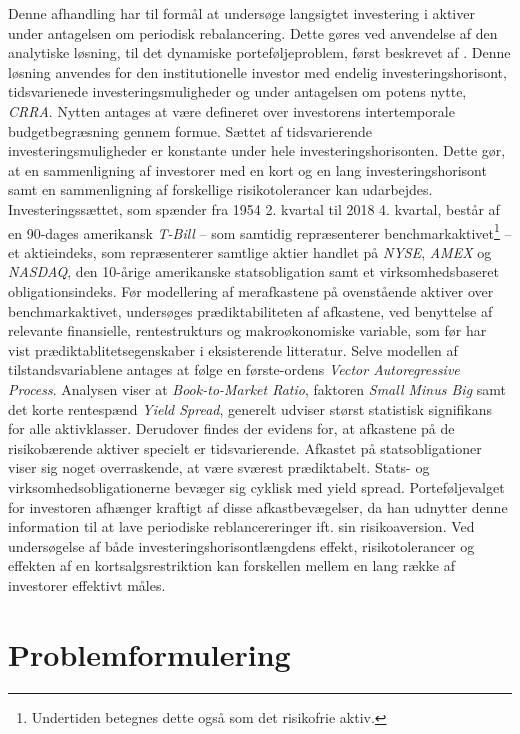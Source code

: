 \documentclass[
  a4paper,
  oneside]{memoir}
\begin{document}
Denne afhandling har til formål at undersøge langsigtet investering i aktiver under antagelsen om periodisk rebalancering. Dette gøres ved anvendelse af den analytiske løsning, til det dynamiske porteføljeproblem, først beskrevet af \citep{JurVic2011}. Denne løsning anvendes for den institutionelle investor med endelig investeringshorisont, tidsvarienede investeringsmuligheder og under antagelsen om potens nytte, \emph{CRRA}. Nytten antages at være defineret over investorens intertemporale budgetbegræsning gennem formue. Sættet af tidsvarierende investeringsmuligheder er konstante under hele investeringshorisonten. Dette gør, at en sammenligning af investorer med en kort og en lang investeringshorisont samt en sammenligning af forskellige risikotolerancer kan udarbejdes. Investeringssættet, som spænder fra 1954 2. kvartal til 2018 4. kvartal, består af en 90-dages amerikansk \emph{T-Bill} -- som samtidig repræsenterer benchmarkaktivet\footnote{Undertiden betegnes dette også som det risikofrie aktiv.} -- et aktieindeks, som repræsenterer samtlige aktier handlet på \emph{NYSE}, \emph{AMEX} og \emph{NASDAQ}, den 10-årige amerikanske statsobligation samt et virksomhedsbaseret obligationsindeks. Før modellering af merafkastene på ovenstående aktiver over benchmarkaktivet, undersøges prædiktabiliteten af afkastene, ved benyttelse af relevante finansielle, rentestrukturs og makroøkonomiske variable, som før har vist prædiktablitetsegenskaber i eksisterende litteratur. Selve modellen af tilstandsvariablene antages at følge en første-ordens \emph{Vector Autoregressive Process}. Analysen viser at \emph{Book-to-Market Ratio}, faktoren \emph{Small Minus Big} samt det korte rentespænd \emph{Yield Spread}, generelt udviser størst statistisk signifikans for alle aktivklasser. Derudover findes der evidens for, at afkastene på de risikobærende aktiver specielt er tidsvarierende. Afkastet på statsobligationer viser sig noget overraskende, at være sværest prædiktabelt. Stats- og virksomhedsobligationerne bevæger sig cyklisk med yield spread. Porteføljevalget for investoren afhænger kraftigt af disse afkastbevægelser, da han udnytter denne information til at lave periodiske reblancereringer ift. sin risikoaversion. Ved undersøgelse af både investeringshorisontlængdens effekt, risikotolerancer og effekten af en kortsalgsrestriktion kan forskellen mellem en lang række af investorer effektivt måles.

\hypertarget{problemformulering}{%
\section{Problemformulering}\label{problemformulering}}
\end{document}
